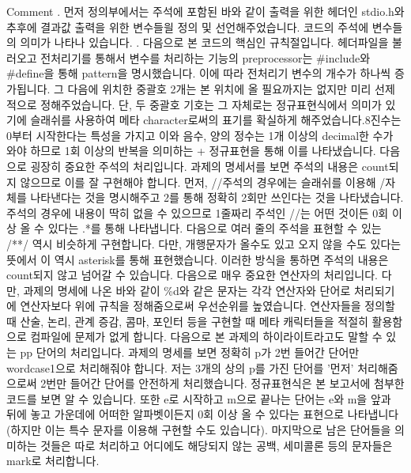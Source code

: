 \documentclass{article}
\begin{document}
Comment
. 먼저 정의부에서는 주석에 포함된 바와 같이 출력을 위한 헤더인 stdio.h와 추후에 결과값 출력을 위한 변수들읠 정의 및 선언해주었습니다. 코드의 주석에 변수들의 의미가 나타나 있습니다.
. 다음으로 본 코드의 핵심인 규칙절입니다. 헤더파일을 불러오고 전처리기를 통해서 변수를  처리하는 기능의 preprocessor는 #include와 #define을 통해 pattern을 명시했습니다. 이에 따라 전처리기 변수의 개수가 하나씩 증가됩니다. 그 다음에 위치한 중괄호 2개는 본 위치에 올 필요까지는 없지만 미리 선제적으로 정해주었습니다. 단, 두 중괄호 기호는 그 자체로는 정규표현식에서 의미가 있기에 슬래쉬를 사용하여 메타 character로써의 표기를 확실하게 해주었습니다.8진수는 0부터 시작한다는 특성을 가지고 이와 음수, 양의 정수는 1개 이상의 decimal한 수가 와야 하므로 1회 이상의 반복을 의미하는 + 정규표현을 통해 이를 나타냈습니다. 다음으로 굉장히 중요한 주석의 처리입니다. 과제의 명세서를 보면 주석의 내용은 count되지 않으므로 이를 잘 구현해야 합니다. 먼저, //주석의 경우에는 슬래쉬를 이용해 /자체를 나타낸다는 것을 명시해주고 {2}를 통해 정확히 2회만 쓰인다는 것을 나타냈습니다. 주석의 경우에 내용이 딱히 없을 수 있으므로 1줄짜리 주석인 //는 어떤 것이든 0회 이상 올 수 있다는 .*를 통해 나타냅니다. 다음으로 여러 줄의 주석을 표현할 수 있는 /**/ 역시 비슷하게 구현합니다. 다만, 개행문자가 올수도 있고 오지 않을 수도 있다는 뜻에서 이 역시 asterisk를 통해 표현했습니다. 이러한 방식을 통하면 주석의 내용은 count되지 않고 넘어갈 수 있습니다. 다음으로 매우 중요한 연산자의 처리입니다. 다만, 과제의 명세에 나온 바와 같이 \%d와 같은 문자는 각각 연산자와 단어로 처리되기에 연산자보다 위에 규칙을 정해줌으로써 우선순위를 높였습니다. 연산자들을 정의할 때 산술, 논리, 관계 증감, 콤마, 포인터 등을 구현할 때 메타 캐릭터들을 적절히 활용함으로 컴파일에 문제가 없게 합니다. 다음으로 본 과제의 하이라이트라고도 말할 수 있는 pp 단어의 처리입니다. 과제의 명세를 보면 정확히 p가 2번 들어간 단어만 wordcase1으로 처리해줘야 합니다. 저는 3개의 상의 p를 가진 단어를 '먼저' 처리해줌으로써 2번만 들어간 단어를 안전하게 처리했습니다. 정규표현식은 본 보고서에 첨부한 코드를 보면 알 수 있습니다. 또한 e로 시작하고 m으로 끝나는 단어는 e와 m을 앞과 뒤에 놓고 가운데에 어떠한 알파벳이든지 0회 이상 올 수 있다는 표현으로 나타냅니다(하지만 이는 특수 문자를 이용해 구현할 수도 있습니다). 마지막으로 남은 단어들을 의미하는 것들은 따로 처리하고 어디에도 해당되지 않는 공백, 세미콜론 등의 문자들은 mark로 처리합니다. 
\end{document}
